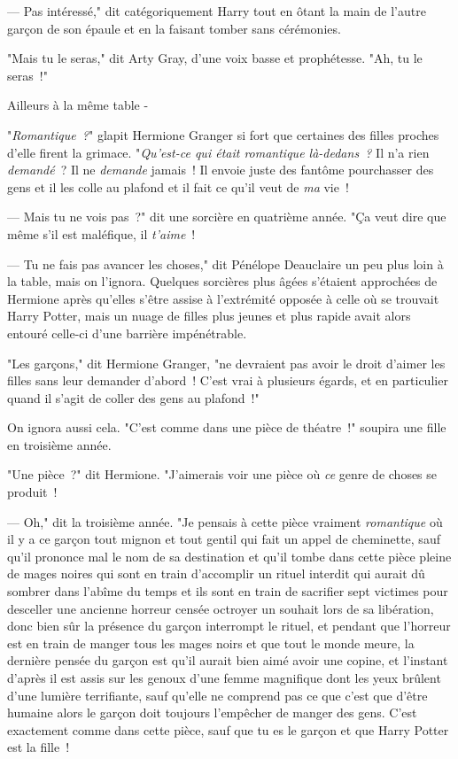 --- Pas intéressé," dit catégoriquement Harry tout en ôtant la main de l'autre garçon de son épaule et en la faisant tomber sans cérémonies.

"Mais tu le seras," dit Arty Gray, d'une voix basse et prophétesse. "Ah, tu le seras~!"

Ailleurs à la même table -

"\emph{Romantique~?}" glapit Hermione Granger si fort que certaines des filles proches d'elle firent la grimace. "\emph{Qu'est-ce qui était romantique là-dedans~?} Il n'a rien \emph{demandé}~? Il ne \emph{demande} jamais~! Il envoie juste des fantôme pourchasser des gens et il les colle au plafond et il fait ce qu'il veut de \emph{ma} vie~!

--- Mais tu ne vois pas~?" dit une sorcière en quatrième année. "Ça veut dire que même s'il est maléfique, il \emph{t'aime}~!

--- Tu ne fais pas avancer les choses," dit Pénélope Deauclaire un peu plus loin à la table, mais on l'ignora. Quelques sorcières plus âgées s'étaient approchées de Hermione après qu'elles s'être assise à l'extrémité opposée à celle où se trouvait Harry Potter, mais un nuage de filles plus jeunes et plus rapide avait alors entouré celle-ci d'une barrière impénétrable.

"Les garçons," dit Hermione Granger, "ne devraient pas avoir le droit d'aimer les filles sans leur demander d'abord~! C'est vrai à plusieurs égards, et en particulier quand il s'agit de coller des gens au plafond~!"

On ignora aussi cela. "C'est comme dans une pièce de théatre~!" soupira une fille en troisième année.

"Une pièce~?" dit Hermione. "J'aimerais voir une pièce où \emph{ce} genre de choses se produit~!

--- Oh," dit la troisième année. "Je pensais à cette pièce vraiment \emph{romantique} où il y a ce garçon tout mignon et tout gentil qui fait un appel de cheminette, sauf qu'il prononce mal le nom de sa destination et qu'il tombe dans cette pièce pleine de mages noires qui sont en train d'accomplir un rituel interdit qui aurait dû sombrer dans l'abîme du temps et ils sont en train de sacrifier sept victimes pour desceller une ancienne horreur censée octroyer un souhait lors de sa libération, donc bien sûr la présence du garçon interrompt le rituel, et pendant que l'horreur est en train de manger tous les mages noirs et que tout le monde meure, la dernière pensée du garçon est qu'il aurait bien aimé avoir une copine, et l'instant d'après il est assis sur les genoux d'une femme magnifique dont les yeux brûlent d'une lumière terrifiante, sauf qu'elle ne comprend pas ce que c'est que d'être humaine alors le garçon doit toujours l'empêcher de manger des gens. C'est exactement comme dans cette pièce, sauf que tu es le garçon et que Harry Potter est la fille~!

